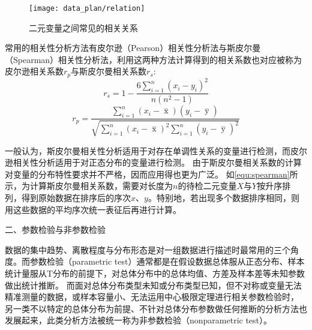 \begin{figure}[htbp]
      \centering
      \texttt{[image: data\_plan/relation]}
      \caption[二元变量之间常见的相关关系]{\label{fig:relation}二元变量之间常见的相关关系\cite{IXL2022}}
\end{figure}

常用的相关性分析方法有皮尔逊（Pearson）相关性分析法与斯皮尔曼（Spearman）相关性分析法，利用这两种方法计算得到的相关系数也对应被称为皮尔逊相关系数$r_p$与斯皮尔曼相关系数$r_s$:
\begin{equation}
      \label{equ:spearman}
      r_s=1-\frac{6\sum_{i=1}^{n}(x_{i}-y_{i})^2}{n(n^2-1)}
\end{equation}
\begin{equation}
      \label{equ:pearson}
      r_p=\frac{\sum_{i=1}^n{(x_i- \mathop{x} \limits^-)(y_i- \mathop{y} \limits^-)}}{\sqrt{{\sum_{i=1}^n}{{(x_i- \mathop{x} \limits^-)^2\sum_{i=1}^n}{(y_i- \mathop{y} \limits^-)^2}}}}
\end{equation}

一般认为，斯皮尔曼相关性分析适用于对存在单调性关系的变量进行检测，而皮尔逊相关性分析适用于对正态分布的变量进行检测。
由于斯皮尔曼相关系数的计算对变量的分布特性要求并不严格，因而应用得也更为广泛。
如\autoref{equ:spearman}所示，为计算斯皮尔曼相关系数，需要对长度为$n$的待检二元变量$X$与$Y$按升序排列，得到原始数据在排序后的序次$x$、$y$。特别地，若出现多个数据排序相同，则用这些数据的平均序次统一表征后再进行计算。

二、参数检验与非参数检验

数据的集中趋势、离散程度与分布形态是对一组数据进行描述时最常用的三个角度\cite{Hu2021}。而参数检验（parametric test）通常都是在假设数据总体服从正态分布、样本统计量服从T分布的前提下，对总体分布中的总体均值、方差及样本差等未知参数做出统计推断。
而面对总体分布类型未知或分布类型已知，但不对称或变量无法精准测量的数据，或样本容量小、无法运用中心极限定理进行相关参数检验时，
另一类不以特定的总体分布为前提、不针对总体分布参数做任何推断的分析方法也发展起来，此类分析方法被统一称为非参数检验（nonparametric test）\cite{Guo2017,Hu2021,Zhang2019}。

